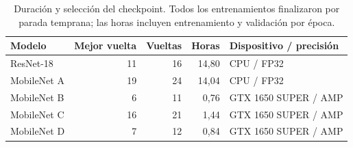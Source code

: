 \begin{table}[H]
\centering
\small
\caption{Duración y selección del checkpoint. Todos los entrenamientos finalizaron por parada temprana; las horas incluyen entrenamiento y validación por época.}
\label{tab:training}
\begin{tabularx}{\linewidth}{Y r r r l}
\toprule
\textbf{Modelo} & \textbf{Mejor vuelta} & \textbf{Vueltas} & \textbf{Horas} & \textbf{Dispositivo / precisión}\\
\midrule
ResNet-18 & 11 & 16 & 14,80 & CPU / FP32\\
MobileNet A & 19 & 24 & 14,04 & CPU / FP32\\
MobileNet B & 6 & 11 & 0,76 & GTX 1650 SUPER / AMP\\
MobileNet C & 16 & 21 & 1,44 & GTX 1650 SUPER / AMP\\
MobileNet D & 7 & 12 & 0,84 & GTX 1650 SUPER / AMP\\
\bottomrule
\end{tabularx}
\end{table}
